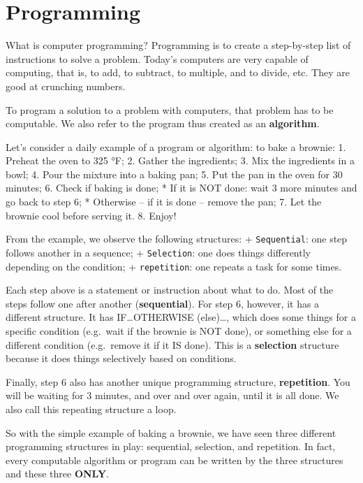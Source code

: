 \documentclass[
  letterpaper,
]{scrbook}
\begin{document}
\chapter*{Programming}\label{programming}


What is computer programming? Programming is to create a step-by-step
list of instructions to solve a problem. Today's computers are very
capable of computing, that is, to add, to subtract, to multiple, and to
divide, etc. They are good at crunching numbers.

To program a solution to a problem with computers, that problem has to
be computable. We also refer to the program thus created as an
\textbf{algorithm}.

Let's consider a daily example of a program or algorithm: to bake a
brownie: 1. Preheat the oven to 325 °F; 2. Gather the ingredients; 3.
Mix the ingredients in a bowl; 4. Pour the mixture into a baking pan; 5.
Put the pan in the oven for 30 minutes; 6. Check if baking is done; * If
it is NOT done: wait 3 more minutes and go back to step 6; * Otherwise
-- if it is done -- remove the pan; 7. Let the brownie cool before
serving it. 8. Enjoy!

From the example, we observe the following structures: +
\texttt{Sequential}: one step follows another in a sequence; +
\texttt{Selection}: one does things differently depending on the
condition; + \texttt{repetition}: one repeats a task for some times.

Each step above is a statement or instruction about what to do. Most of
the steps follow one after another (\textbf{sequential}). For step 6,
however, it has a different structure. It has IF\ldots OTHERWISE
(else)\ldots, which does some things for a specific condition (e.g.~wait
if the brownie is NOT done), or something else for a different condition
(e.g.~remove it if it IS done). This is a \textbf{selection} structure
because it does things selectively based on conditions.

Finally, step 6 also has another unique programming structure,
\textbf{repetition}. You will be waiting for 3 minutes, and over and
over again, until it is all done. We also call this repeating structure
a loop.

So with the simple example of baking a brownie, we have seen three
different programming structures in play: sequential, selection, and
repetition. In fact, every computable algorithm or program can be
written by the three structures and these three \textbf{ONLY}.
\end{document}
